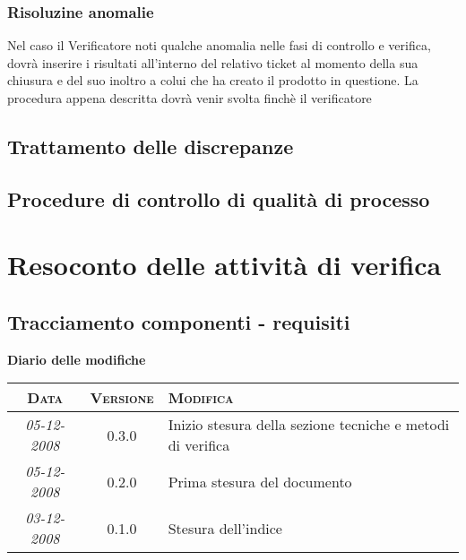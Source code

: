 \documentclass[11pt,a4paper]{article}
\newcommand{\modifiche} 
{
\newpage
\begin{center}
\textbf{Diario delle modifiche} \\
\bigskip
\begin{tabular}{|c|c|p{0.51\textwidth}|}
\hline
\textsc{Data} & \textsc{Versione} & \textsc{Modifica} \\
\hline
\hline
\textit{05-12-2008} & 0.3.0 & Inizio stesura della sezione tecniche e metodi di verifica \\
\hline
\textit{05-12-2008} & 0.2.0 & Prima stesura del documento \\
\hline
\textit{03-12-2008} & 0.1.0 & Stesura dell'indice \\
\hline
\end{tabular}
\end{center}
}
\begin{document}
\subsubsection{Risoluzine anomalie}
Nel caso il Verificatore noti qualche anomalia nelle fasi di controllo e verifica, dovrà inserire i risultati all'interno del relativo ticket al momento della sua chiusura e del suo inoltro a colui che ha creato il prodotto in questione.
La procedura appena descritta dovrà venir svolta finchè il verificatore 


\subsection{Trattamento delle discrepanze}
\subsection{Procedure di controllo di qualità di processo}
\section{Resoconto delle attività di verifica}
\subsection{Tracciamento componenti - requisiti}

\modifiche
\end{document}
